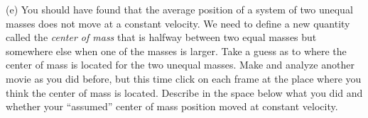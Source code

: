 (e) You should have found that the average position of a system of two unequal masses does not move at a constant velocity. We need to define a new quantity called the \textit{center of mass} that is halfway between two equal masses but somewhere else when one of the masses is larger. Take a guess as to where the center of mass is located for the two unequal masses. Make and analyze another movie as you did before, but this time click on each frame at the place where you think the center of mass is located. Describe in the space below what you did and whether your ``assumed'' center of mass position moved at constant velocity.

